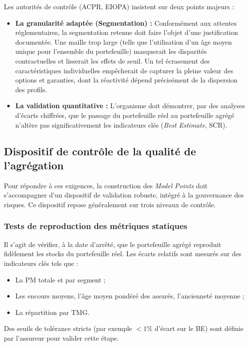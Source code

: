 Les autorités de contrôle (ACPR, EIOPA) insistent sur deux points majeurs :
\begin{itemize}
    \item \textbf{La granularité adaptée (Segmentation) :} Conformément aux attentes réglementaires, la segmentation retenue doit faire l'objet d'une justification documentée. Une maille trop large (telle que l'utilisation d'un âge moyen unique pour l'ensemble du portefeuille) masquerait les disparités contractuelles et lisserait les effets de seuil. Un tel écrasement des caractéristiques individuelles empêcherait de capturer la pleine valeur des options et garanties, dont la réactivité dépend précisément de la dispersion des profils.
    \item \textbf{La validation quantitative :} L'organisme doit démontrer, par des analyses d'écarts chiffrées, que le passage du portefeuille réel au portefeuille agrégé n'altère pas significativement les indicateurs clés (\textit{Best Estimate}, SCR).
\end{itemize}

\subsection{Dispositif de contrôle de la qualité de l'agrégation}
\label{subsec:seuil_agg}

Pour répondre à ces exigences, la construction des \textit{Model Points} doit s'accompagner d'un dispositif de validation robuste, intégré à la gouvernance des risques. Ce dispositif repose généralement sur trois niveaux de contrôle.

\subsubsection{Tests de reproduction des métriques statiques}
Il s'agit de vérifier, à la date d'arrêté, que le portefeuille agrégé reproduit fidèlement les stocks du portefeuille réel. Les écarts relatifs sont mesurés sur des indicateurs clés tels que :
\begin{itemize}
    \item La PM totale et par segment ;
    \item Les encours moyens, l'âge moyen pondéré des assurés, l'ancienneté moyenne ;
    \item La répartition par TMG.
\end{itemize}
Des seuils de tolérance stricts (par exemple $<1\%$ d'écart sur le BE) sont définis par l'assureur pour valider cette étape.

